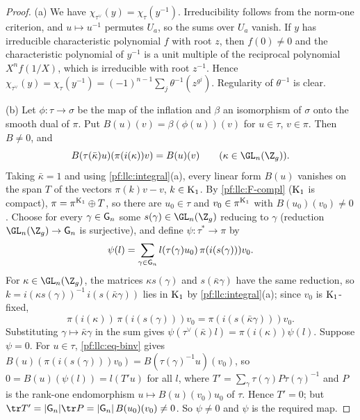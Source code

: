 \begin{proof}
(a) We have $\chi_{\tau^\vee}(y)=\chi_\tau(y^{-1})$. Irreducibility follows from the norm-one criterion, and
$u\mapsto u^{-1}$ permutes $U_a$, so the sums over $U_a$ vanish. If $y$ has irreducible characteristic
polynomial $f$ with root $z$, then $f(0)\ne0$ and the characteristic polynomial of $y^{-1}$ is a unit multiple of
the reciprocal polynomial $X^nf(1/X)$, which is irreducible with root $z^{-1}$. Hence
$\chi_{\tau^\vee}(y)=\chi_\tau(y^{-1})=(-1)^{n-1}\sum_j\theta^{-1}(z^{g^j})$. Regularity of $\theta^{-1}$ is clear.

(b) Let $\phi\colon\tau\to\sigma$ be the map of the inflation and $\beta$ an isomorphism of $\sigma$ onto the smooth
dual of $\pi$. Put $B(u)(v)=\beta(\phi(u))(v)$ for $u\in\tau$, $v\in\pi$. Then $B\neq0$, and
\begin{equation}\label{pf:llc:eq-binv}
  B(\tau(\bar\kappa)u)(\pi(i(\kappa))v)=B(u)(v)\qquad(\kappa\in\GL_n(\Z_g)).
\end{equation}
Taking $\bar\kappa=1$ and using \cref{pf:llc:integral}(a), every linear form $B(u)$ vanishes on the span $T$ of the
vectors $\pi(k)v-v$, $k\in\mathrm{K}_1$. By \ref{pf:llc:F-compl} ($\mathrm{K}_1$ is compact), $\pi=\pi^{\mathrm{K}_1}\oplus T$, so there are
$u_0\in\tau$ and
$v_0\in\pi^{\mathrm{K}_1}$ with $B(u_0)(v_0)\ne0$. Choose for every $\gamma\in\mathsf{G}_n$ some $s(\gamma)\in\GL_n(\Z_g)$ reducing to
$\gamma$ (reduction $\GL_n(\Z_g)\to\llcG_n$ is surjective), and define $\psi\colon\tau^*\to\pi$ by
\[
  \psi(l)=\sum_{\gamma\in\mathsf{G}_n}l(\tau(\gamma)u_0)\,\pi(i(s(\gamma)))v_0 .
\]
For $\kappa\in\GL_n(\Z_g)$, the matrices $\kappa s(\gamma)$ and $s(\bar\kappa\gamma)$ have the same reduction, so
$k=i(\kappa s(\gamma))^{-1}\,i(s(\bar\kappa\gamma))$ lies in $\mathrm{K}_1$ by \cref{pf:llc:integral}(a); since $v_0$ is $\mathrm{K}_1$-fixed,
\[
  \pi(i(\kappa))\,\pi(i(s(\gamma)))v_0=\pi(i(s(\bar\kappa\gamma)))v_0 .
\]
Substituting $\gamma\mapsto\bar\kappa\gamma$ in the sum gives $\psi(\tau^\vee(\bar\kappa)l)=\pi(i(\kappa))\psi(l)$. Suppose $\psi=0$. For
$u\in\tau$, \eqref{pf:llc:eq-binv} gives $B(u)(\pi(i(s(\gamma)))v_0)=B(\tau(\gamma)^{-1}u)(v_0)$, so $0=B(u)(\psi(l))=l(T'u)$ for
all $l$, where $T'=\sum_\gamma\tau(\gamma)P\tau(\gamma)^{-1}$ and $P$ is the rank-one endomorphism $u\mapsto B(u)(v_0)u_0$ of
$\tau$. Hence $T'=0$; but $\tr T'=|\llcG_n|\tr P=|\llcG_n|\,B(u_0)(v_0)\ne0$. So $\psi\ne0$ and $\psi$ is the required map.
\end{proof}


